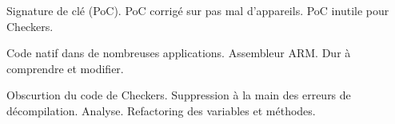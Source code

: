 Signature de clé (PoC).
PoC corrigé sur pas mal d'appareils.
PoC inutile pour Checkers.

Code natif dans de nombreuses applications.
Assembleur ARM.
Dur à comprendre et modifier.

Obscurtion du code de Checkers.
Suppression à la main des erreurs de décompilation.
Analyse.
Refactoring des variables et méthodes.
